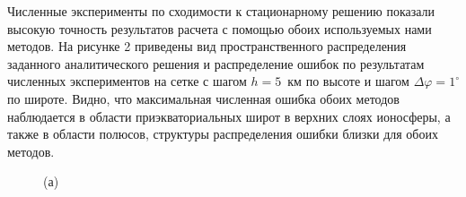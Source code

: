 \documentclass[14pt, a4paper]{extarticle}
\begin{document}
Численные эксперименты по сходимости к стационарному решению показали высокую точность результатов расчета с помощью обоих используемых нами методов. На рисунке 2 приведены вид пространственного распределения заданного аналитического решения и распределение ошибок по результатам численных экспериментов на сетке с шагом $h = 5$~км по высоте и шагом $\Delta\varphi = 1^\circ$ по широте. Видно, что максимальная численная ошибка обоих методов наблюдается в области приэкваториальных широт в верхних слоях ионосферы, а также в области полюсов, структуры распределения ошибки близки для обоих методов.

\begin{figure}[H]

(а) 

\end{figure}
\end{document}
